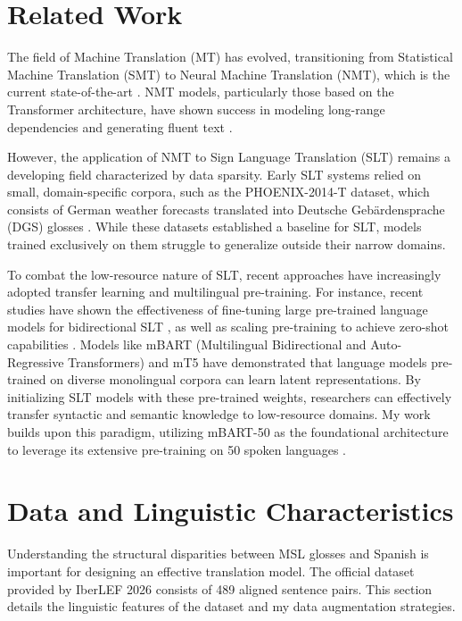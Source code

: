 \documentclass[11pt,a4paper,english]{ceurart}
\begin{document}
\section{Related Work}

The field of Machine Translation (MT) has evolved, transitioning from Statistical Machine Translation (SMT) \cite{koehn2003statistical} to Neural Machine Translation (NMT), which is the current state-of-the-art \cite{bahdanau2014neural}. NMT models, particularly those based on the Transformer architecture, have shown success in modeling long-range dependencies and generating fluent text \cite{vaswani2017attention}.

However, the application of NMT to Sign Language Translation (SLT) remains a developing field characterized by data sparsity. Early SLT systems relied on small, domain-specific corpora, such as the PHOENIX-2014-T dataset, which consists of German weather forecasts translated into Deutsche Geb\"ardensprache (DGS) glosses \cite{camgoz2018neural}. While these datasets established a baseline for SLT, models trained exclusively on them struggle to generalize outside their narrow domains.

To combat the low-resource nature of SLT, recent approaches have increasingly adopted transfer learning and multilingual pre-training. For instance, recent studies have shown the effectiveness of fine-tuning large pre-trained language models for bidirectional SLT \cite{decoster2023finetuning}, as well as scaling pre-training to achieve zero-shot capabilities \cite{zhang2024scaling}. Models like mBART (Multilingual Bidirectional and Auto-Regressive Transformers) and mT5 \cite{xue2021mt5} have demonstrated that language models pre-trained on diverse monolingual corpora can learn latent representations. By initializing SLT models with these pre-trained weights, researchers can effectively transfer syntactic and semantic knowledge to low-resource domains. My work builds upon this paradigm, utilizing mBART-50 as the foundational architecture to leverage its extensive pre-training on 50 spoken languages \cite{tang2020multilingual}.

\section{Data and Linguistic Characteristics}

Understanding the structural disparities between MSL glosses and Spanish is important for designing an effective translation model. The official dataset provided by IberLEF 2026 consists of 489 aligned sentence pairs. This section details the linguistic features of the dataset and my data augmentation strategies.
\end{document}
